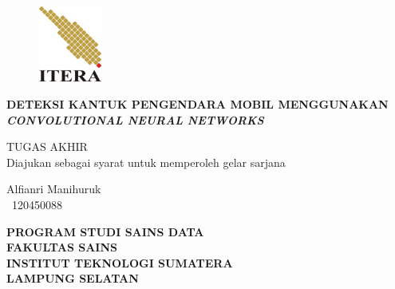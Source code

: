 \clearpage
\pagestyle{empty}
% 

\begin{center}
\smallskip

    \begin{figure}[h]
    	\centering
    	\includegraphics[width=2.1cm, height=2.5cm, keepaspectratio]{figures/itera-logo}
    \end{figure}

	\large \bfseries \MakeUppercase{DETEKSI KANTUK PENGENDARA MOBIL MENGGUNAKAN \textit{CONVOLUTIONAL NEURAL NETWORKS}}
	\vfill

    \large \uppercase{Tugas Akhir}\\
    {\normalsize \normalfont Diajukan sebagai syarat untuk memperoleh gelar sarjana}
    \vfill

    \normalsize \normalfont Alfianri Manihuruk\\
    \ 120450088
    \vfill

    \normalsize \bfseries
    \uppercase{
        Program Studi Sains Data \\
        Fakultas Sains\\
        Institut Teknologi Sumatera\\
        Lampung Selatan
    }\medskip

    \the\year{}

\end{center}

\clearpage
